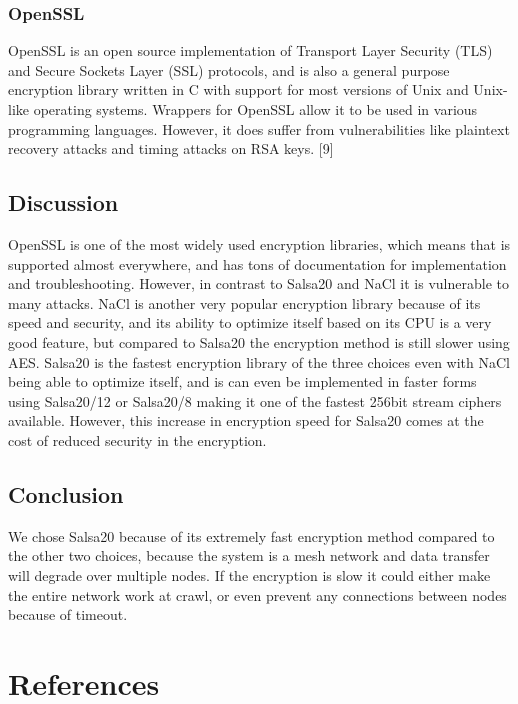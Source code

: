 \documentclass[onecolumn, draftclsnofoot,10pt, compsoc]{IEEEtran}
\begin{document}
\subsubsection{OpenSSL}
OpenSSL is an open source implementation of Transport Layer Security (TLS) and Secure Sockets Layer (SSL) protocols, and is also a general purpose encryption library written in C with support for most versions of Unix and Unix-like operating systems. Wrappers for OpenSSL allow it to be used in various programming languages. However, it does suffer from vulnerabilities like plaintext recovery attacks and timing attacks on RSA keys. [9]




\subsection{Discussion}
OpenSSL is one of the most widely used encryption libraries, which means that is supported almost everywhere, and has tons of documentation for implementation and troubleshooting. However, in contrast to Salsa20 and NaCl it is vulnerable to many attacks. NaCl is another very popular encryption library because of its speed and security, and its ability to optimize itself based on its CPU is a very good feature, but compared to Salsa20 the encryption method is still slower using AES. Salsa20 is the fastest encryption library of the three choices even with NaCl being able to optimize itself, and is can even be implemented in faster forms using Salsa20/12 or Salsa20/8 making it one of the fastest 256bit stream ciphers available. However, this increase in encryption speed for Salsa20 comes at the cost of reduced security in the encryption.

\subsection{Conclusion}
We chose Salsa20 because of its extremely fast encryption method compared to the other two choices, because the system is a mesh network and data transfer will degrade over multiple nodes. If the encryption is slow it could either make the entire network work at crawl, or even prevent any connections between nodes because of timeout.



\section{References}
\end{document}
